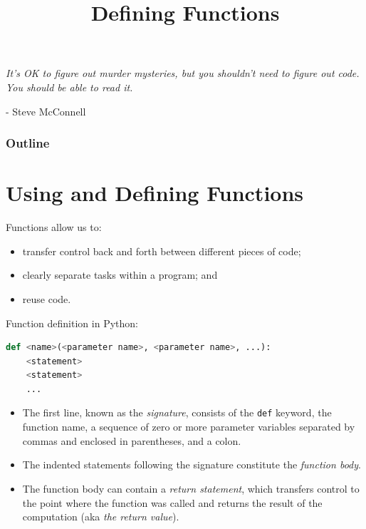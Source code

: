 \documentclass[8pt,a4paper,compress,handout]{beamer}
\title{Defining Functions}
\date{}
\begin{document}
\begin{frame}
\hfill
\begin{minipage}{150pt}
\begin{flushright}
\tiny \emph{It's OK to figure out murder mysteries, but you shouldn't need to figure out code. You should be able to read it.}

\smallskip

- Steve McConnell
\end{flushright}
\end{minipage}
\vfill
\titlepage
\end{frame}

\begin{frame}
\frametitle{Outline}
\tableofcontents
\end{frame}

\section{Using and Defining Functions}
\begin{frame}[fragile]
Functions allow us to:
\begin{itemize}
\item transfer control back and forth between different pieces of code; 
\item clearly separate tasks within a program; and
\item reuse code.
\end{itemize}

\bigskip

Function definition in Python:
\begin{lstlisting}[language=Python]
def <name>(<parameter name>, <parameter name>, ...):
    <statement>
    <statement>
    ...
\end{lstlisting}

\begin{itemize}
\item The first line, known as the \emph{signature}, consists of the \lstinline{def} keyword, the function name, a sequence of zero or more parameter variables separated by commas and enclosed in parentheses, and a colon.

\item The indented statements following the signature constitute the \emph{function body}.

\item The function body can contain a \emph{return statement}, which transfers control to the point where the function was called and returns the result of the computation (aka \emph{the return value}).
\end{itemize}
\end{frame}
\end{document}
